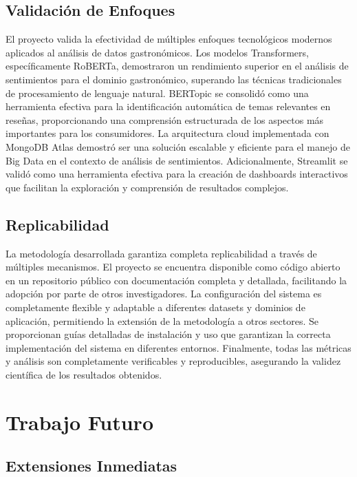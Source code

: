 \documentclass[12pt,a4paper,twoside,openany]{book}
\begin{document}
\subsection{Validación de Enfoques}

El proyecto valida la efectividad de múltiples enfoques tecnológicos modernos aplicados al análisis de datos gastronómicos. Los modelos Transformers, específicamente RoBERTa, demostraron un rendimiento superior en el análisis de sentimientos para el dominio gastronómico, superando las técnicas tradicionales de procesamiento de lenguaje natural. BERTopic se consolidó como una herramienta efectiva para la identificación automática de temas relevantes en reseñas, proporcionando una comprensión estructurada de los aspectos más importantes para los consumidores. La arquitectura cloud implementada con MongoDB Atlas demostró ser una solución escalable y eficiente para el manejo de Big Data en el contexto de análisis de sentimientos. Adicionalmente, Streamlit se validó como una herramienta efectiva para la creación de dashboards interactivos que facilitan la exploración y comprensión de resultados complejos.

\subsection{Replicabilidad}

La metodología desarrollada garantiza completa replicabilidad a través de múltiples mecanismos. El proyecto se encuentra disponible como código abierto en un repositorio público con documentación completa y detallada, facilitando la adopción por parte de otros investigadores. La configuración del sistema es completamente flexible y adaptable a diferentes datasets y dominios de aplicación, permitiendo la extensión de la metodología a otros sectores. Se proporcionan guías detalladas de instalación y uso que garantizan la correcta implementación del sistema en diferentes entornos. Finalmente, todas las métricas y análisis son completamente verificables y reproducibles, asegurando la validez científica de los resultados obtenidos.

\section{Trabajo Futuro}

\subsection{Extensiones Inmediatas}
\end{document}
